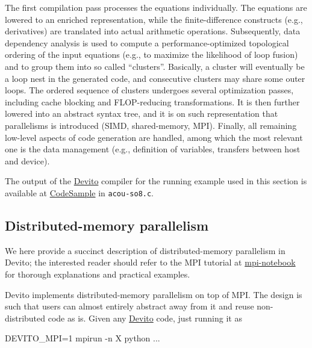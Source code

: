 \documentclass[conference]{IEEEtran}
\newenvironment{Shaded}{}{}
\newcommand{\DecValTok}[1]{\textcolor[rgb]{0.25,0.63,0.44}{{#1}}}
\newcommand{\NormalTok}[1]{{#1}}
\begin{document}
The first compilation pass processes the equations individually. The
equations are lowered to an enriched representation, while the
finite-difference constructs (e.g., derivatives) are translated into
actual arithmetic operations. Subsequently, data dependency analysis is
used to compute a performance-optimized topological ordering of the
input equations (e.g., to maximize the likelihood of loop fusion) and to
group them into so called ``clusters''. Basically, a cluster will
eventually be a loop nest in the generated code, and consecutive
clusters may share some outer loops. The ordered sequence of clusters
undergoes several optimization passes, including cache blocking and
FLOP-reducing transformations. It is then further lowered into an
abstract syntax tree, and it is on such representation that parallelisms
is introduced (SIMD, shared-memory, MPI). Finally, all remaining
low-level aspects of code generation are handled, among which the most
relevant one is the data management (e.g., definition of variables,
transfers between host and device).

The output of the \href{https://github.com/devitocodes/devito}{Devito}
compiler for the running example used in this section is available at
\href{https://github.com/mloubout/SC20Paper/tree/master/gencode}{CodeSample}
in \texttt{acou-so8.c}.

\subsection{Distributed-memory
parallelism}\label{distributed-memory-parallelism}

We here provide a succinct description of distributed-memory parallelism
in Devito; the interested reader should refer to the MPI tutorial at
\href{https://github.com/devitocodes/devito/blob/master/examples/mpi/overview.ipynb}{mpi-notebook}
for thorough explanations and practical examples.

Devito implements distributed-memory parallelism on top of MPI. The
design is such that users can almost entirely abstract away from it and
reuse non-distributed code as is. Given any
\href{https://github.com/devitocodes/devito}{Devito} code, just running
it as

\begin{Shaded}
\begin{Highlighting}[]
\NormalTok{DEVITO_MPI=}\DecValTok{1} \NormalTok{mpirun -n X python ...}
\end{Highlighting}
\end{Shaded}
\end{document}
